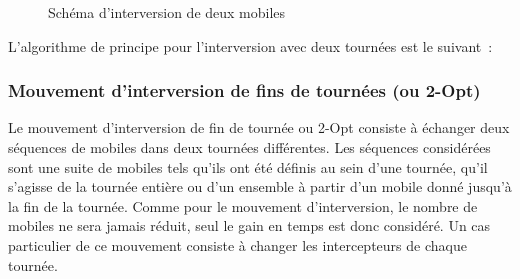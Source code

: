 			\begin{figure}[h!]
			\begin{subfigure}[b]{.54\linewidth}
				\centering
				\begin{tikzpicture}[schema]
					
				\end{tikzpicture}
				\label{subfig:move_swap1route}
			\end{subfigure}
			\hfill
			\begin{subfigure}[b]{.45\linewidth}
				\centering
				\begin{tikzpicture}[schema]
					
				\end{tikzpicture}
				\label{subfig:move_swap2routes}
			\end{subfigure}
			\caption{Schéma d'interversion de deux mobiles}
			\label{fig:move_swap}
			\end{figure}

			\newpage
			L'algorithme de principe pour l'interversion avec deux tournées est le suivant :
			\begin{code}
				\begin{algo}[informal]
					\BEGIN
									\ENDFORGEN
								\ENDFORGEN
							\ENDFORGEN
						\ENDFORGEN
					\END
				\end{algo}
			\end{code}

		\subsubsection{Mouvement d'interversion de fins de tournées (ou 2-Opt)}
			Le mouvement d'interversion de fin de tournée ou 2-Opt consiste à échanger deux séquences de mobiles dans deux tournées différentes. Les séquences considérées sont une suite de mobiles tels qu'ils ont été définis au sein d'une tournée, qu'il s'agisse de la tournée entière ou d'un ensemble à partir d'un mobile donné jusqu'à la fin de la tournée. Comme pour le mouvement d'interversion, le nombre de mobiles ne sera jamais réduit, seul le gain en temps est donc considéré. Un cas particulier de ce mouvement consiste à changer les intercepteurs de chaque tournée.


